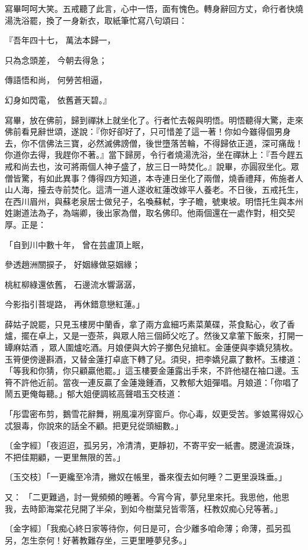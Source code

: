 寫畢呵呵大笑。五戒聽了此言，心中一悟，面有愧色。轉身辭回方丈，命行者快燒湯洗浴罷，換了一身新衣，取紙筆忙寫八句頌曰：

『吾年四十七，  萬法本歸一，

只為念頭差，  今朝去得急；

傳語悟和尚，  何勞苦相逼，

幻身如閃電，  依舊蒼天碧。』

寫畢，放在佛前，歸到禪牀上就坐化了。行者忙去報與明悟。明悟聽得大驚，走來佛前看見辭世頌，遂說：『你好卻好了，只可惜差了這一著！你如今雖得個男身去，你不信佛法三寶，必然滅佛謗僧，後世墮落苦輪，不得歸依正道，深可痛哉！你道你去得，我趕你不著。』當下歸房，令行者燒湯洗浴，坐在禪牀上：『吾今趕五戒和尚去也，汝可將兩個人神子盛了，放三日一時焚化。』說畢，亦圓寂坐化。眾僧皆驚，有如此異事？傳得四方知道，本寺連日坐化了兩僧，燒香禮拜，佈施者人山人海，擡去寺前焚化。這清一道人遂收紅蓮改嫁平人養老。不日後，五戒托生，在西川眉州，與蘇老泉居士做兒子，名喚蘇軾，字子瞻，號東坡。明悟托生與本州姓謝道法為子，為端卿，後出家為僧，取名佛印。他兩個還在一處作對，相交契厚。正是：

「自到川中數十年，  曾在芸盧頂上眠，

參透趙洲關捩子，  好姻緣做惡姻緣；

桃紅柳綠還依舊，  石邊流水響潺潺，

今影指引菩堤路，  再休錯意戀紅蓮。」

薛姑子說罷，只見玉樓房中蘭香，拿了兩方盒細巧素菜菓碟，茶食點心，收了香爐，擺在卓上，又是一壺茶，與眾人陪三個師父吃了。然後又拿葷下飯來，打開一罈麻姑酒 ，眾人圍爐吃酒。月娘便與大妗子擲色兒搶紅。金蓮便與李嬌兒猜枚。玉筲便傍邊斟酒，又替金蓮打卓底下轉了兒。須臾，把李嬌兒贏了數杯。玉樓道：「等我和你猜，你只顧贏他罷。」這玉樓要金蓮露出手來，不許他褪在袖口邊。玉筲不許他近前。當夜一連反贏了金蓮幾鍾酒，又教郁大姐彈唱。月娘道：「你唱了鬧五更俺每聽。」郁大姐便調絃高聲唱玉交枝道：

「彤雲密布剪，鵝雪花辭舞，朔風凜冽穿窗戶。你心毒，奴更受苦。爹娘罵得奴心忒狠毒，你說來的話全不顧。把更兒從頭細數。」

〔金字經〕「夜迢迢，孤另另，冷清清，更靜初，不寄平安一紙書。腮邊流淚珠，不把佳期顧，一更里無限的苦。」

〔玉交枝〕「一更纔至冷清，撇奴在帳里，番來復去如何睡？二更里淚珠垂。」

又：  「二更難過，討一覺頻頻的睡著。今宵今宵，夢兒里來托。我思他，他思我，去時節海棠花兒開了半朵，到如今樹葉兒皆零落，枉教奴痴心兒等著。」

〔金字經〕「我痴心終日家等待你，何日是可，合少離多咱命薄；命薄，孤另孤另，怎生奈何！好著教難存坐，三更里睡夢兒多。」

